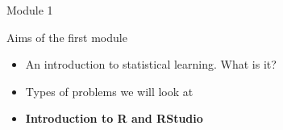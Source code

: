 \documentclass[
  10pt,
  ignorenonframetext,
]{beamer}
\providecommand{\tightlist}{%
  \setlength{\itemsep}{0pt}\setlength{\parskip}{0pt}}
\begin{document}
\begin{frame}{Module 1}
\protect\hypertarget{module-1}{}
\begin{block}{Aims of the first module}
\protect\hypertarget{aims-of-the-first-module}{}
\(~\)

\begin{itemize}
\tightlist
\item
  An introduction to statistical learning. What is it?
\end{itemize}

\vspace{2mm}

\begin{itemize}
\tightlist
\item
  Types of problems we will look at
\end{itemize}

\vspace{2mm}

\begin{itemize}
\tightlist
\item
  \textbf{Introduction to R and RStudio }
\end{itemize}
\end{block}
\end{frame}
\end{document}
